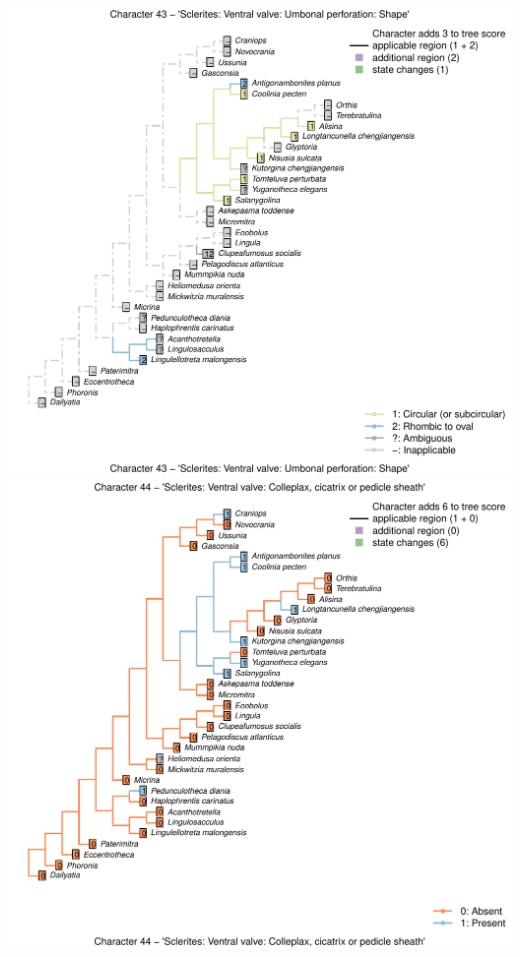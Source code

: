 \documentclass[]{book}
\theoremstyle{definition}
\theoremstyle{definition}
\theoremstyle{definition}
\theoremstyle{remark}
\begin{document}
\includegraphics{Brachiopod_phylogeny_files/figure-latex/unnamed-chunk-4-43.pdf}
\includegraphics{Brachiopod_phylogeny_files/figure-latex/unnamed-chunk-4-44.pdf}
\end{document}
